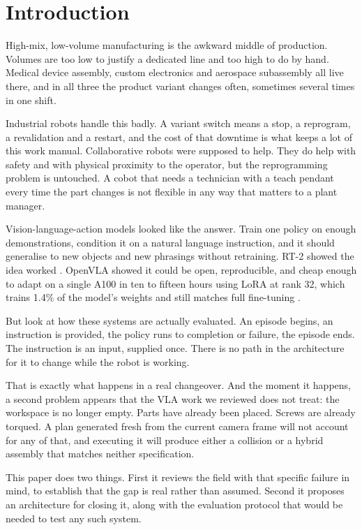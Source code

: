 \documentclass[conference]{IEEEtran}
\begin{document}
\section{Introduction}

High-mix, low-volume manufacturing is the awkward middle of production.
Volumes are too low to justify a dedicated line and too high to do by
hand. Medical device assembly, custom electronics and aerospace
subassembly all live there, and in all three the product variant changes
often, sometimes several times in one shift.

Industrial robots handle this badly. A variant switch means a stop, a
reprogram, a revalidation and a restart, and the cost of that downtime is
what keeps a lot of this work manual. Collaborative robots were supposed
to help. They do help with safety and with physical proximity to the
operator, but the reprogramming problem is untouched. A cobot that needs
a technician with a teach pendant every time the part changes is not
flexible in any way that matters to a plant manager.

Vision-language-action models looked like the answer. Train one policy on
enough demonstrations, condition it on a natural language instruction,
and it should generalise to new objects and new phrasings without
retraining. RT-2 showed the idea worked \cite{rt2}. OpenVLA showed it
could be open, reproducible, and cheap enough to adapt on a single A100
in ten to fifteen hours using LoRA at rank 32, which trains 1.4\% of the
model's weights and still matches full fine-tuning \cite{openvla}.

But look at how these systems are actually evaluated. An episode begins,
an instruction is provided, the policy runs to completion or failure, the
episode ends. The instruction is an input, supplied once. There is no
path in the architecture for it to change while the robot is working.

That is exactly what happens in a real changeover. And the moment it
happens, a second problem appears that the VLA work we reviewed does not treat: the
workspace is no longer empty. Parts have already been placed. Screws are
already torqued. A plan generated fresh from the current camera frame
will not account for any of that, and executing it will produce either a
collision or a hybrid assembly that matches neither specification.

This paper does two things. First it reviews the field with that specific
failure in mind, to establish that the gap is real rather than assumed.
Second it proposes an architecture for closing it, along with the
evaluation protocol that would be needed to test any such system.
\end{document}
